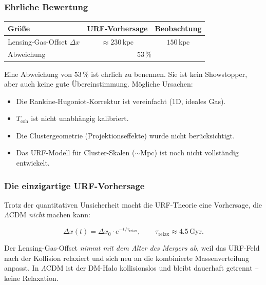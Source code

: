 \documentclass[12pt,a4paper]{article}
\theoremstyle{definition}
\begin{document}
\subsubsection{Ehrliche Bewertung}

\begin{center}
\begin{tabular}{lcc}
\toprule
Größe & URF-Vorhersage & Beobachtung \\
\midrule
Lensing-Gas-Offset $\Delta x$ & $\approx 230\,\mathrm{kpc}$ & $150\,\mathrm{kpc}$ \\
Abweichung & \multicolumn{2}{c}{$53\,\%$} \\
\bottomrule
\end{tabular}
\end{center}

Eine Abweichung von $53\,\%$ ist ehrlich zu benennen. Sie ist kein
Showstopper, aber auch keine gute Übereinstimmung. Mögliche Ursachen:

\begin{itemize}
  \item Die Rankine-Hugoniot-Korrektur ist vereinfacht (1D, ideales Gas).
  \item $T_{\mathrm{coh}}$ ist nicht unabhängig kalibriert.
  \item Die Clustergeometrie (Projektionseffekte) wurde nicht berücksichtigt.
  \item Das URF-Modell für Cluster-Skalen ($\sim$Mpc) ist noch nicht
        vollständig entwickelt.
\end{itemize}

\subsubsection{Die einzigartige URF-Vorhersage}

Trotz der quantitativen Unsicherheit macht die URF-Theorie eine
Vorhersage, die $\Lambda$CDM \emph{nicht} machen kann:

\begin{equation}
  \boxed{\Delta x(t) = \Delta x_0 \cdot e^{-t/\tau_{\mathrm{relax}}},
  \qquad \tau_{\mathrm{relax}} \approx 4.5\,\mathrm{Gyr}.}
\end{equation}

Der Lensing-Gas-Offset \emph{nimmt mit dem Alter des Mergers ab},
weil das URF-Feld nach der Kollision relaxiert und sich neu an die
kombinierte Massenverteilung anpasst. In $\Lambda$CDM ist der DM-Halo
kollisionslos und bleibt dauerhaft getrennt -- keine Relaxation.
\end{document}
